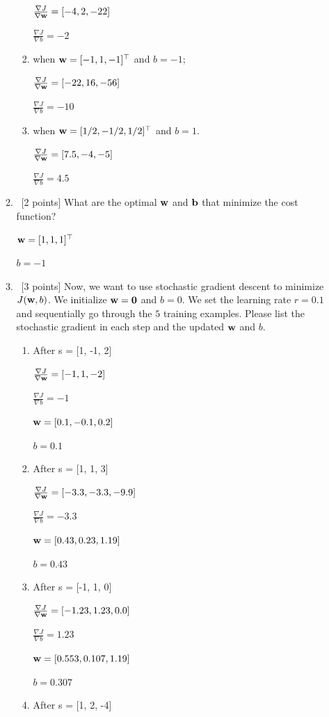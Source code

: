 \documentclass[12pt, fullpage,letterpaper]{article}
\begin{document}
\begin{enumerate}
\begin{enumerate}
\begin{enumerate}
		$\frac{\nabla J}{\nabla {\bf w}} = [-4, 2, -22]$
		
		$\frac{\nabla J}{\nabla b} = -2$
		\item when ${\bf w} = [-1,1,-1]^\top$ and $b = -1$;
		
		$\frac{\nabla J}{\nabla {\bf w}} = [-22, 16, -56]$
		
		$\frac{\nabla J}{\nabla b} = -10$
		\item when ${\bf w} = [1/2,-1/2,1/2]^\top$ and $b = 1$.
		
		$\frac{\nabla J}{\nabla {\bf w}} = [7.5, -4, -5]$
		
		$\frac{\nabla J}{\nabla b} = 4.5$
	\end{enumerate}
	\item~[2 points] What are the optimal ${\bf w}$ and ${\bf b}$ that minimize the cost function? 
	
	${\bf w} = [1, 1, 1]^\top$
	
	$b = -1$
	
	\item~[3 points] Now, we want to use stochastic gradient descent to minimize $J({\bf w}, b)$. We initialize ${\bf w} = {\bf 0}$ and $b = 0$. We set the learning rate $r = 0.1$ and sequentially go through the $5$ training examples. Please list the stochastic gradient in each step and the updated ${\bf w}$ and $b$.
	
	\begin{enumerate}
		\item After s = [1, -1, 2]
		
		$\frac{\nabla J}{\nabla {\bf w}} = [-1, 1, -2]$
		
		$\frac{\nabla J}{\nabla b} = -1$
		
		${\bf w} = [0.1, -0.1, 0.2]$
		
		$b = 0.1$
		\item After s = [1, 1, 3]
		
		$\frac{\nabla J}{\nabla {\bf w}} = [-3.3, -3.3, -9.9]$
		
		$\frac{\nabla J}{\nabla b} = -3.3$
		
		${\bf w} = [0.43, 0.23, 1.19]$
		
		$b = 0.43$
		\item After s = [-1, 1, 0]
		
		$\frac{\nabla J}{\nabla {\bf w}} = [-1.23, 1.23, 0.0]$
		
		$\frac{\nabla J}{\nabla b} = 1.23$
		
		${\bf w} = [0.553, 0.107, 1.19]$
		
		$b = 0.307$
		\item After s = [1, 2, -4]
		

\end{enumerate}
\end{enumerate}
\end{enumerate}
\end{document}

